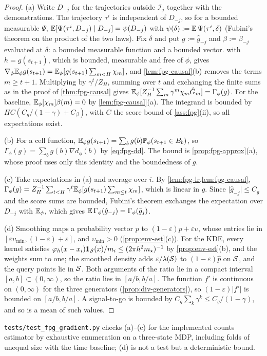 \begin{proof}
(a) Write $D_{-j}$ for the trajectories outside $\mathcal I_j$ together with the demonstrations. The trajectory $\tau^i$ is independent of $D_{-j}$, so for a bounded measurable $\Psi$, $\mathbb{E}[\Psi(\tau^i,D_{-j})\mid D_{-j}]=\psi(D_{-j})$ with $\psi(\delta):=\mathbb{E}\,\Psi(\tau^i,\delta)$ (Fubini's theorem on the product of the two laws).
Fix $\delta$ and put $g:=\hat g_{-j}$ and $\beta:=\beta_{-j}$ evaluated at $\delta$: a bounded measurable function and a bounded vector.
 with $h=g(s_{t+1})$, which is bounded, measurable and free of $\phi$, gives $\nabla_\phi\mathbb{E}_\phi g(s_{t+1})=\mathbb{E}_\phi[g(s_{t+1})\sum_{m<H}\chi_m]$, and \cref{lem:fpg-causal}(b) removes the terms $m\ge t+1$.
Multiplying by $\gamma^t/Z_H$, summing over $t$ and exchanging the finite sums as in the proof of \cref{thm:fpg-causal} gives $\mathbb{E}_\phi[Z_H^{-1}\sum_m\gamma^m\chi_m\hat G_m]=\Gamma_\phi(g)$.
For the baseline, $\mathbb{E}_\phi[\chi_m]\beta(m)=0$ by \cref{lem:fpg-causal}(a). The integrand is bounded by $HC(C_g/(1-\gamma)+C_\beta)$, with $C$ the score bound of \cref{ass:fpg}(ii), so all expectations exist.

(b) For a cell function, $\mathbb{E}_\phi g(s_{t+1})=\sum_bg(b)\mathbb{P}_\phi(s_{t+1}\in B_b)$, so $\Gamma_\phi(g)=\sum_bg(b)\nabla d_\phi(b)$ by \eqref{eq:fpg-dd}. The bound is \cref{prop:fpg-approx}(a), whose proof uses only this identity and the boundedness of $g$.

(c) Take expectations in (a) and average over $i$. By \cref{lem:fpg-lr,lem:fpg-causal}, $\Gamma_\phi(g)=Z_H^{-1}\sum_{t<H}\gamma^t\mathbb{E}_\phi[g(s_{t+1})\sum_{m\le t}\chi_m]$, which is linear in $g$. Since $\lvert\hat g_{-j}\rvert\le C_g$ and the score sums are bounded, Fubini's theorem exchanges the expectation over $D_{-j}$ with $\mathbb{E}_\phi$, which gives $\mathbb{E}\,\Gamma_\phi(\hat g_{-j})=\Gamma_\phi(\bar g_j)$.

(d) Smoothing maps a probability vector $p$ to $(1-\varepsilon)p+\varepsilon\upsilon$, whose entries lie in $[\varepsilon\upsilon_{\min},(1-\varepsilon)+\varepsilon]$, and $\upsilon_{\min}>0$ (\cref{prop:env-est}(c)).
For the KDE, every kernel satisfies $\varphi_h(x-x_i)\mathbf{1}_{\mathcal{S}}(x)/m_i\le(2\pi h^2m_\star)^{-1}$ by \cref{prop:env-est}(b), and the weights sum to one; the smoothed density adds $\varepsilon/\lambda(\mathcal{S})$ to $(1-\varepsilon)\hat p$ on $\mathcal{S}$, and the query points lie in $\mathcal{S}$.
Both arguments of the ratio lie in a compact interval $[a,b]\subset(0,\infty)$, so the ratio lies in $[a/b,b/a]$. The function $f'$ is continuous on $(0,\infty)$ for the three generators (\cref{prop:div-generators}), so $(1-\varepsilon)\lvert f'\rvert$ is bounded on $[a/b,b/a]$.
A signal-to-go is bounded by $C_g\sum_k\gamma^k\le C_g/(1-\gamma)$, and so is a mean of such values.
\end{proof}

\noindent \texttt{tests/test\_fpg\_gradient.py} checks (a)--(c) for the implemented counts estimator by exhaustive enumeration on a three-state MDP, including folds of unequal size with the time baseline; (d) is not a test but a deterministic bound.

